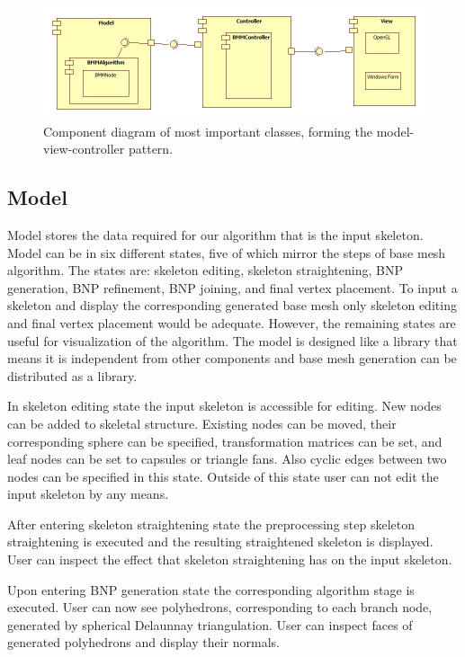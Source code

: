 \begin{figure}[h]
    \centering
    \includegraphics[width=\textwidth]{images/classes}
    \caption[Component diagram of classes]{Component diagram of most important classes, forming the model-view-controller pattern.}
    \label{fig:classes}
\end{figure}

\subsection{Model}

Model stores the data required for our algorithm that is the input skeleton.
Model can be in six different states, five of which mirror the steps of base mesh algorithm.
The states are: skeleton editing, skeleton straightening, BNP generation, BNP refinement, BNP joining, and final vertex placement.
To input a skeleton and display the corresponding generated base mesh only skeleton editing and final vertex placement would be adequate.
However, the remaining states are useful for visualization of the algorithm.
The model is designed like a library that means it is independent from other components and base mesh generation can be distributed as a library.

In skeleton editing state the input skeleton is accessible for editing.
New nodes can be added to skeletal structure.
Existing nodes can be moved, their corresponding sphere can be specified, transformation matrices can be set, and leaf nodes can be set to capsules or triangle fans.
Also cyclic edges between two nodes can be specified in this state.
Outside of this state user can not edit the input skeleton by any means.

After entering skeleton straightening state the preprocessing step skeleton straightening is executed and the resulting straightened skeleton is displayed.
User can inspect the effect that skeleton straightening has on the input skeleton.

Upon entering BNP generation state the corresponding algorithm stage is executed.
User can now see polyhedrons, corresponding to each branch node, generated by spherical Delaunnay triangulation.
User can inspect faces of generated polyhedrons and display their normals.

